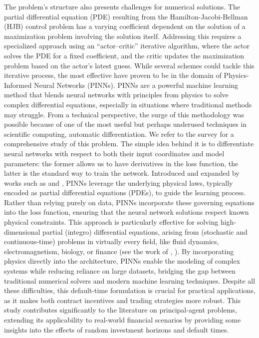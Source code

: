 \documentclass[11pt,a4paper]{article}
\theoremstyle{thmstyleone}%
\theoremstyle{thmstyletwo}%
\theoremstyle{thmstylethree}%
\begin{document}
The problem's structure also presents challenges for numerical solutions. The partial differential equation (PDE) resulting from the Hamilton-Jacobi-Bellman (HJB) control problem has a varying coefficient dependent on the solution of a maximization problem involving the solution itself. Addressing this requires a specialized approach using an ``actor--critic''
 iterative algorithm, where the actor solves the PDE for a fixed coefficient, and the critic updates the maximization problem based on the actor's latest guess. While several schemes could tackle this iterative process, the most effective have proven to be in the domain of Physics-Informed Neural Networks (PINNs). PINNs are a powerful machine learning method that blends neural networks with principles from physics to solve complex differential equations, especially in situations where traditional methods may struggle. From a technical perspective, the surge of this methodology was possible because of one of the most useful but perhaps underused techniques in
scientific computing, automatic differentiation. We refer to the survey \cite{baydin2018automatic} for a comprehensive study of this problem. The simple idea behind it is to differentiate neural networks with respect to both their input coordinates and model parameters: the former allows us to have derivatives in the loss function, the latter is the standard way to train the network. Introduced and expanded by works such as \cite{raissi2017physics} and \cite{sirignano2018dgm}, PINNs leverage the underlying physical laws, typically encoded as partial differential equations (PDEs), to guide the learning process. Rather than relying purely on data, PINNs incorporate these governing equations into the loss function, ensuring that the neural network solutions respect known physical constraints. This approach is particularly effective for solving high-dimensional partial (integro) differential equations, arising from (stochastic and continuous-time) problems in virtually every field, like fluid dynamics, electromagnetism, biology, or finance (see the work of \cite{baldacci2019market}, \cite{baldacci2022governmental}). By incorporating physics directly into the architecture, PINNs enable the modeling of complex systems while reducing reliance on large datasets, bridging the gap between traditional numerical solvers and modern machine learning techniques. Despite all these difficulties, this default-time formulation is crucial for practical applications, as it makes both contract incentives and trading strategies more robust. This study contributes significantly to the literature on principal-agent problems, extending its applicability to real-world financial scenarios by providing some insights into the effects of random investment horizons and default times.\\
\end{document}
